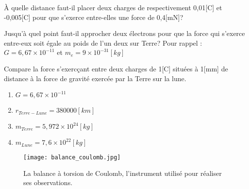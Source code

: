 \begin{exercise}
    À quelle distance faut-il placer deux charges de respectivement 0,01[C] et -0,005[C] pour que s'exerce entre-elles une force de 0,4[mN]?
\end{exercise}

\begin{exercise}
    Jusqu'à quel point faut-il approcher deux électrons pour que la force qui s'exerce entre-eux soit égale au poids de l'un deux sur Terre?
    Pour rappel : \(G=6,67 \times 10^{-11}\) et \(m_e=9 \times 10^{-31} [kg]\)
\end{exercise}

\begin{exercise}
    Compare la force s'exercçant entre deux charges de 1[C] situées à 1[mm] de distance à la force de gravité exercée par la Terre sur la lune.
    \begin{enumerate}[label=\textbullet]
        \item \(G=6,67 \times 10^{-11}\)
        \item \(r_{Terre-Lune}=380000[km]\)
        \item \(m_{Terre}=5,972 \times 10^{24} [kg]\)
        \item \(m_{Lune}=7,6 \times 10^{22}[kg]\)
    \end{enumerate}

\end{exercise}

\begin{figure}[h!]
    \centering
    \texttt{[image: balance\_coulomb.jpg]}
    \caption{La balance à torsion de Coulomb, l'instrument utilisé pour réaliser ses observations.}
    \label{balance_coulomb}
\end{figure}
